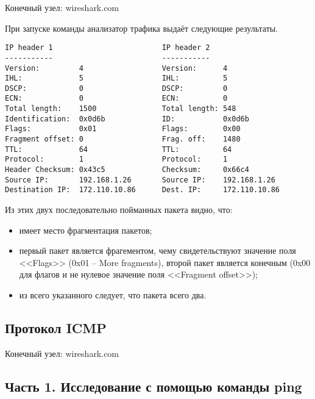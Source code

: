 \documentclass[12pt, a4paper] {ncc}
\begin{document}
    Конечный узел: wireshark.com

    При запуске команды анализатор трафика выдаёт следующие результаты.
    \begin{verbatim}
IP header 1                         IP header 2
-----------                         -----------
Version:         4                  Version:      4
IHL:             5                  IHL:          5
DSCP:            0                  DSCP:         0
ECN:             0                  ECN:          0
Total length:    1500               Total length: 548
Identification:  0x0d6b             ID:           0x0d6b
Flags:           0x01               Flags:        0x00
Fragment offset: 0                  Frag. off:    1480
TTL:             64                 TTL:          64
Protocol:        1                  Protocol:     1
Header Checksum: 0x43c5             Checksum:     0x66c4
Source IP:       192.168.1.26       Source IP:    192.168.1.26
Destination IP:  172.110.10.86      Dest. IP:     172.110.10.86
    \end{verbatim}
    
    Из этих двух последовательно пойманных пакета видно, что:
    \begin{itemize}
        \item имеет место фрагментация пакетов;
        \item первый пакет является фрагементом, чему свидетельствуют значение
              поля <<Flags>> (0x01 -- More fragments), второй пакет является конечным
              (0x00 для флагов и не нулевое значение поля <<Fragment offset>>);
        \item из всего указанного следует, что пакета всего два.
    \end{itemize}

    \subsection*{Протокол ICMP}
    Конечный узел: wireshark.com
        \subsection*{Часть 1. Исследование с помощью команды ping}
        
\end{document}
